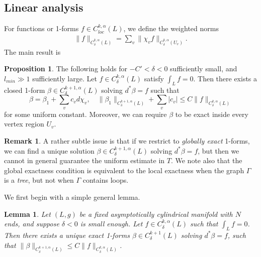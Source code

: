 \documentclass{article}
\newtheorem{lem}[thm]{Lemma}
\theoremstyle{definition}
\newtheorem{rmk}{Remark}
\newtheorem{prop}[thm]{Proposition}
\begin{document}
	
	
	\subsection{Linear analysis}
	
	
	
	
	For functions or 1-forms $f \in C^{k,\alpha}_{loc}(L)$, we define the weighted norms
	\begin{align*}
		\|f\|_{C^{k,\alpha}_\delta(L)}
		= \sum_{v} \| \chi_v f\|_{C^{k,\alpha}_\delta(U_v)}.
	\end{align*}
	The main result is
	
	
	
	\begin{prop}\label{prop:dstar}
		The following holds for $-C'< \delta < 0$ sufficiently small, and $l_{min}\gg 1$ sufficiently large. Let $f \in C^{k,\alpha}_{\delta}(L)$
		satisfy $\int_{L} f = 0$. Then there exists a closed 1-form $\beta\in C^{k+1,\alpha}_\delta(L)$ solving
		$d^*\beta= f$ such that
		\[
		\beta=\beta_1+ \sum_v c_v d\chi_v,\quad \|\beta_1 \|_{C^{k+1,\alpha}_\delta(L)} + \sum_v |c_v|  \le C\|f\|_{C^{k,\alpha}_\delta(L)} \]
		for some uniform constant. Moreover, we can require $\beta$ to be exact inside every vertex region $U_v$.
	\end{prop}
	
	
	
	\begin{rmk}
		A rather subtle issue is that if we restrict to \emph{globally exact} 1-forms, we can find a unique solution $\beta\in C^{k+1,\alpha}_\delta(L)$ solving $d^* \beta =f$, but then we cannot in general guarantee the uniform estimate in $T$. We note also that the global exactness condition is equivalent to the local exactness when the graph $\Gamma$ is a \emph{tree}, but not when $\Gamma$ contains loops.
	\end{rmk}
	
	
	
	We first begin with a simple general lemma.
	
	\begin{lem}
		\label{lem:zero_average}
		Let $(L,g)$ be a fixed
		asymptotically cylindrical manifold  with $N$ ends, and suppose $\delta<0$ is small enough. Let
		$f \in C^{k,\alpha}_\delta(L)$ such that $\int_L f=0$. Then there exists a unique exact 1-forms $\beta\in C^{k+1}_\delta(L)$ solving $d^*\beta= f$, such that
		$ 
		\|\beta\|_{C^{k+1,\alpha}_\delta(L)}  \le C\|f\|_{C^{k,\alpha}_\delta(L)}  $. 
		
	\end{lem}
	
\end{document}
